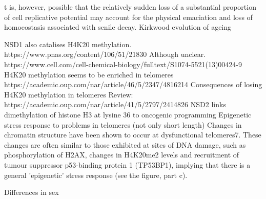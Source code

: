 t is, however, possible that the relatively sudden loss of a substantial proportion of cell replicative potential may account for the physical emaciation and loss of homoeostasis associated with senile decay. Kirkwood evolution of ageing


NSD1 also catalises H4K20 methylation.
https://www.pnas.org/content/106/51/21830
Although unclear.
https://www.cell.com/cell-chemical-biology/fulltext/S1074-5521(13)00424-9
H4K20 methylation seems to be enriched in telomeres
https://academic.oup.com/nar/article/46/5/2347/4816214
Consequences of losing H4K20 methylation in telomeres
Review:
https://academic.oup.com/nar/article/41/5/2797/2414826
NSD2 links dimethylation of histone H3 at lysine 36 to oncogenic programming
Epigenetic stress response to problems in telomeres (not only short length)
Changes in chromatin structure have been shown to occur at dysfunctional telomeres7. These changes are often similar to those exhibited at sites of DNA damage, such as phosphorylation of H2AX, changes in H4K20me2 levels and recruitment of tumour suppressor p53-binding protein 1 (TP53BP1), implying that there is a general 'epigenetic' stress response (see the figure, part c).

Differences in sex
